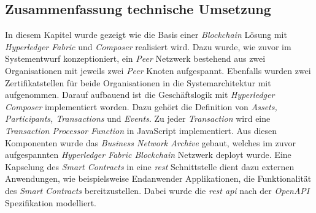 
\subsection{Zusammenfassung technische Umsetzung}
In diesem Kapitel wurde gezeigt wie die Basis einer \textit{Blockchain} Lösung mit \textit{Hyperledger Fabric} und \textit{Composer} realisiert wird. Dazu wurde, wie zuvor im Systementwurf konzeptioniert, ein \textit{Peer} Netzwerk bestehend aus zwei Organisationen mit jeweils zwei \textit{Peer} Knoten aufgespannt. Ebenfalls wurden zwei Zertifikatstellen für beide Organisationen in die Systemarchitektur mit aufgenommen. Darauf aufbauend ist die Geschäftslogik mit \textit{Hyperledger Composer} implementiert worden. Dazu gehört die Definition von \textit{Assets, Participants, Transactions} und \textit{Events}. Zu jeder \textit{Transaction} wird eine \textit{Transaction Processor Function} in JavaScript implementiert. Aus diesen Komponenten wurde das \textit{Business Network Archive} gebaut, welches im zuvor aufgespannten \textit{Hyperledger Fabric Blockchain} Netzwerk deployt wurde. Eine Kapselung des \textit{Smart Contracts} in eine \textit{\ac{rest}} Schnittstelle dient dazu externen Anwendungen, wie beispielsweise Endanwender Applikationen, die Funktionalität des \textit{Smart Contracts} bereitzustellen. Dabei wurde die \textit{\ac{rest} \ac{api}} nach der \textit{OpenAPI} Spezifikation modelliert.

\newpage
